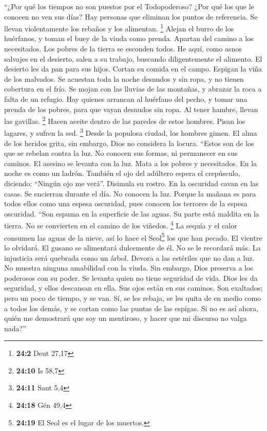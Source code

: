  ``¿Por qué los tiempos no son puestos por el
Todopoderoso? ¿Por qué los que le conocen no ven sus días?
 Hay personas que eliminan los puntos de referencia. Se
llevan violentamente los rebaños y los alimentan. \footnote{\textbf{24:2}
  Deut 27,17}  Alejan el burro de los huérfanos, y toman
el buey de la viuda como prenda.  Apartan del camino a los
necesitados. Los pobres de la tierra se esconden todos. 
He aquí, como asnos salvajes en el desierto, salen a su trabajo,
buscando diligentemente el alimento. El desierto les da pan para sus
hijos.  Cortan su comida en el campo. Espigan la viña de
los malvados.  Se acuestan toda la noche desnudos y sin
ropa, y no tienen cobertura en el frío.  Se mojan con las
lluvias de las montañas, y abrazar la roca a falta de un refugio.
 Hay quienes arrancan al huérfano del pecho, y tomar una
prenda de los pobres,  para que vayan desnudos sin ropa.
Al tener hambre, llevan las gavillas. \footnote{\textbf{24:10} Is 58,7}
 Hacen aceite dentro de las paredes de estos hombres.
Pisan los lagares, y sufren la sed. \footnote{\textbf{24:11} Sant 5,4}
 Desde la populosa ciudad, los hombres gimen. El alma de
los heridos grita, sin embargo, Dios no considera la locura.
 ``Estos son de los que se rebelan contra la luz. No
conocen sus formas, ni permanecer en sus caminos.  El
asesino se levanta con la luz. Mata a los pobres y necesitados. En la
noche es como un ladrón.  También el ojo del adúltero
espera el crepúsculo, diciendo: ``Ningún ojo me verá''. Disimula su
rostro.  En la oscuridad cavan en las casas. Se encierran
durante el día. No conocen la luz.  Porque la mañana es
para todos ellos como una espesa oscuridad, pues conocen los terrores de
la espesa oscuridad.  ``Son espuma en la superficie de
las aguas. Su parte está maldita en la tierra. No se convierten en el
camino de los viñedos. \footnote{\textbf{24:18} Gén 49,4}
 La sequía y el calor consumen las aguas de la nieve, así
lo hace el Seol\footnote{\textbf{24:19} El Seol es el lugar de los
  muertos.} los que han pecado.  El vientre lo olvidará.
El gusano se alimentará dulcemente de él. No se le recordará más. La
injusticia será quebrada como un árbol.  Devora a las
estériles que no dan a luz. No muestra ninguna amabilidad con la viuda.
 Sin embargo, Dios preserva a los poderosos con su poder.
Se levanta quien no tiene seguridad de vida.  Dios les da
seguridad, y ellos descansan en ella. Sus ojos están en sus caminos.
 Son exaltados; pero un poco de tiempo, y se van. Sí, se
les rebaja, se les quita de en medio como a todos los demás, y se cortan
como las puntas de las espigas.  Si no es así ahora,
quién me demostrará que soy un mentiroso, y hacer que mi discurso no
valga nada?''

